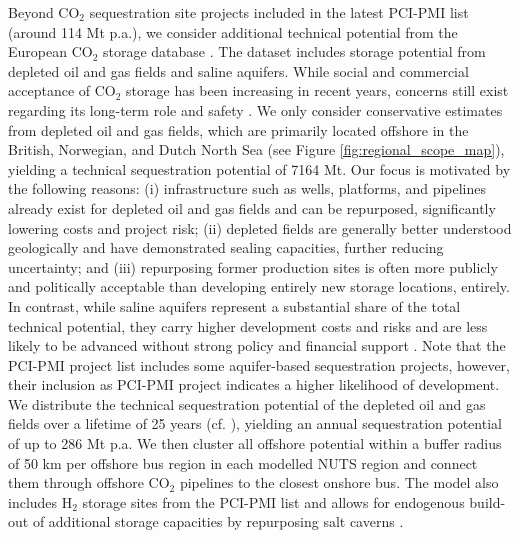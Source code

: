 \documentclass[pdflatex,sn-nature]{sn-jnl}%
\theoremstyle{thmstyleone}%
\theoremstyle{thmstyletwo}%
\theoremstyle{thmstylethree}%
\begin{document}
Beyond CO$_2$ sequestration site projects included in the latest PCI-PMI list (around 114 Mt p.a.), we consider additional technical potential from the European CO$_2$ storage database \cite{europeancommissionEuropeanCO2Storage2020,hofmannH2CO2Network2025}. The dataset includes storage potential from depleted oil and gas fields and saline aquifers. While social and commercial acceptance of CO$_2$ storage has been increasing in recent years, concerns still exist regarding its long-term role and safety \cite{vanalphenSocietalAcceptanceCarbon2007}.
We only consider conservative estimates from depleted oil and gas fields, which are primarily located offshore in the British, Norwegian, and Dutch North Sea (see Figure \ref{fig:regional_scope_map}), yielding a technical sequestration potential of 7164 Mt. Our focus is motivated by the following reasons: (i) infrastructure such as wells, platforms, and pipelines already exist for depleted oil and gas fields and can be repurposed, significantly lowering costs and project risk; (ii) depleted fields are generally better understood geologically and have demonstrated sealing capacities, further reducing uncertainty; and (iii) repurposing former production sites is often more publicly and politically acceptable than developing entirely new storage locations, entirely. In contrast, while saline aquifers represent a substantial share of the total technical potential, they carry higher development costs and risks and are less likely to be advanced without strong policy and financial support \cite{europeancommissionEuropeanCO2Storage2020}. Note that the PCI-PMI project list includes some aquifer-based sequestration projects, however, their inclusion as PCI-PMI project indicates a higher likelihood of development.
We distribute the technical sequestration potential of the depleted oil and gas fields over a lifetime of 25 years (cf. \cite{hofmannH2CO2Network2025}), yielding an annual sequestration potential of up to 286 Mt p.a. We then cluster all offshore potential within a buffer radius of 50 km per offshore bus region in each modelled NUTS region and connect them through offshore CO$_2$ pipelines to the closest onshore bus. 
The model also includes H$_2$ storage sites from the PCI-PMI list and allows for endogenous build-out of additional storage capacities by repurposing salt caverns \cite{neumannPotentialRoleHydrogen2023}.
\end{document}
